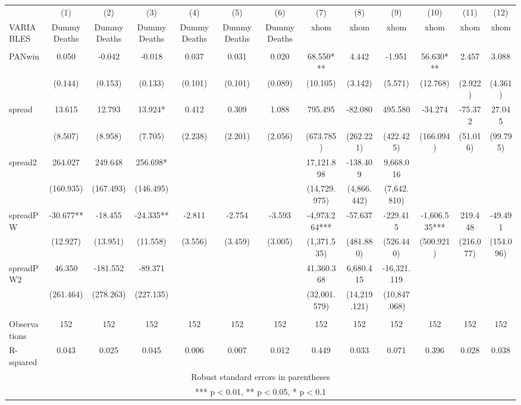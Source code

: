 \begin{tabular}{lcccccccccccc} \hline
 & (1) & (2) & (3) & (4) & (5) & (6) & (7) & (8) & (9) & (10) & (11) & (12) \\
VARIABLES & DummyDeaths & DummyDeaths & DummyDeaths & DummyDeaths & DummyDeaths & DummyDeaths & xhom & xhom & xhom & xhom & xhom & xhom \\ \hline
 &  &  &  &  &  &  &  &  &  &  &  &  \\
PANwin & 0.050 & -0.042 & -0.018 & 0.037 & 0.031 & 0.020 & 68.550*** & 4.442 & -1.951 & 56.630*** & 2.457 & 3.088 \\
 & (0.144) & (0.153) & (0.133) & (0.101) & (0.101) & (0.089) & (10.105) & (3.142) & (5.571) & (12.768) & (2.922) & (4.361) \\
spread & 13.615 & 12.793 & 13.924* & 0.412 & 0.309 & 1.088 & 795.495 & -82.080 & 495.580 & -34.274 & -75.372 & 27.045 \\
 & (8.507) & (8.958) & (7.705) & (2.238) & (2.201) & (2.056) & (673.785) & (262.221) & (422.425) & (166.094) & (51.016) & (99.795) \\
spread2 & 264.027 & 249.648 & 256.698* &  &  &  & 17,121.898 & -138.409 & 9,668.016 &  &  &  \\
 & (160.935) & (167.493) & (146.495) &  &  &  & (14,729.975) & (4,866.442) & (7,642.810) &  &  &  \\
spreadPW & -30.677** & -18.455 & -24.335** & -2.811 & -2.754 & -3.593 & -4,973.264*** & -57.637 & -229.415 & -1,606.535*** & 219.448 & -49.491 \\
 & (12.927) & (13.951) & (11.558) & (3.556) & (3.459) & (3.005) & (1,371.535) & (481.880) & (526.440) & (500.921) & (216.077) & (154.096) \\
spreadPW2 & 46.350 & -181.552 & -89.371 &  &  &  & 41,360.368 & 6,680.415 & -16,321.119 &  &  &  \\
 & (261.464) & (278.263) & (227.135) &  &  &  & (32,001.579) & (14,219.121) & (10,847.068) &  &  &  \\
 &  &  &  &  &  &  &  &  &  &  &  &  \\
Observations & 152 & 152 & 152 & 152 & 152 & 152 & 152 & 152 & 152 & 152 & 152 & 152 \\
 R-squared & 0.043 & 0.025 & 0.045 & 0.006 & 0.007 & 0.012 & 0.449 & 0.033 & 0.071 & 0.396 & 0.028 & 0.038 \\ \hline
\multicolumn{13}{c}{ Robust standard errors in parentheses} \\
\multicolumn{13}{c}{ *** p$<$0.01, ** p$<$0.05, * p$<$0.1} \\
\end{tabular}
